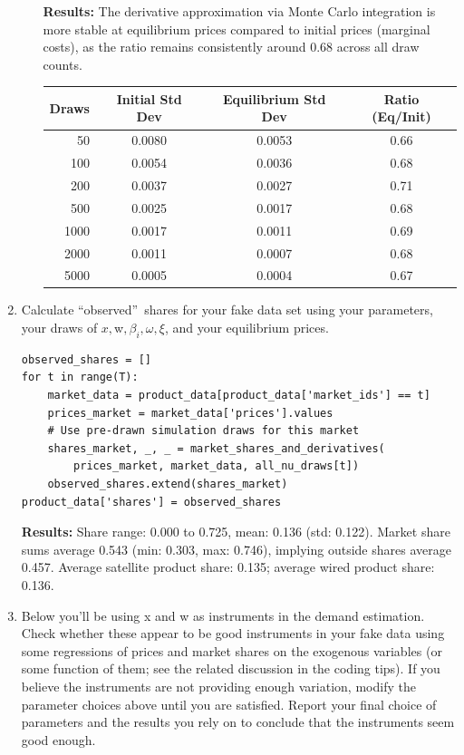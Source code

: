 \documentclass[english,11pt]{article}
\begin{document}
\begin{enumerate}
\begin{enumerate}
 \textbf{Results:} The derivative approximation via Monte Carlo integration is more stable at equilibrium prices compared to initial prices (marginal costs), as the ratio remains consistently around 0.68 across all draw counts.

\begin{center}
\begin{tabular}{r|c|c|c}
Draws & Initial Std Dev & Equilibrium Std Dev & Ratio (Eq/Init) \\
\hline
50    & 0.0080 & 0.0053 & 0.66 \\
100   & 0.0054 & 0.0036 & 0.68 \\
200   & 0.0037 & 0.0027 & 0.71 \\
500   & 0.0025 & 0.0017 & 0.68 \\
1000  & 0.0017 & 0.0011 & 0.69 \\
2000  & 0.0011 & 0.0007 & 0.68 \\
5000  & 0.0005 & 0.0004 & 0.67 \\
\end{tabular}
\end{center}
\end{enumerate}
\item Calculate \textquotedblleft observed\textquotedblright\ shares for
your fake data set using your parameters, your draws of $x,$w$,\beta
_{i},\omega ,\xi $, and your equilibrium prices.
\begin{verbatim}
observed_shares = []
for t in range(T):
    market_data = product_data[product_data['market_ids'] == t]
    prices_market = market_data['prices'].values
    # Use pre-drawn simulation draws for this market
    shares_market, _, _ = market_shares_and_derivatives(
        prices_market, market_data, all_nu_draws[t])
    observed_shares.extend(shares_market)
product_data['shares'] = observed_shares
\end{verbatim}
\textbf{Results:} Share range: 0.000 to 0.725, mean: 0.136 (std: 0.122). Market share sums average 0.543 (min: 0.303, max: 0.746), implying outside shares average 0.457. Average satellite product share: 0.135; average wired product share: 0.136.


\item

Below you'll be using x and w as instruments in the demand estimation. Check whether these appear to be good instruments in your fake data using some regressions of prices and market shares on the exogenous variables (or some function of them; see the related discussion in the coding tips). If you believe the instruments are not providing enough variation, modify the parameter choices above until you are satisfied. Report your final choice of parameters and the results you rely on to conclude that the instruments seem good enough.
\end{enumerate}
\end{document}
